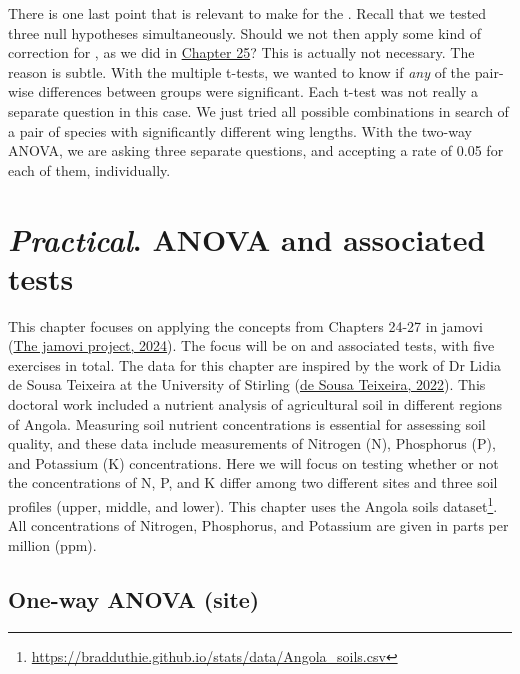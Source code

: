 \documentclass[
  openany]{krantz}
\begin{document}
There is one last point that is relevant to make for the .
Recall that we tested three null hypotheses simultaneously.
Should we not then apply some kind of correction for , as we did in \protect\hyperlink{Chapter_25}{Chapter 25}?
This is actually not necessary.
The reason is subtle.
With the multiple t-tests, we wanted to know if \emph{any} of the pair-wise differences between groups were significant.
Each t-test was not really a separate question in this case.
We just tried all possible combinations in search of a pair of species with significantly different wing lengths.
With the two-way ANOVA, we are asking three separate questions, and accepting a  rate of 0.05 for each of them, individually.

\hypertarget{Chapter_28}{%
\chapter{\texorpdfstring{\emph{Practical}. ANOVA and associated tests}{Practical. ANOVA and associated tests}}\label{Chapter_28}}

This chapter focuses on applying the concepts from Chapters 24-27 in jamovi (\protect\hyperlink{ref-Jamovi2022}{The jamovi project, 2024}).
The focus will be on  and associated tests, with five exercises in total.
The data for this chapter are inspired by the work of Dr Lidia de Sousa Teixeira at the University of Stirling (\protect\hyperlink{ref-Teixeira2022}{de Sousa Teixeira, 2022}).
This doctoral work included a nutrient analysis of agricultural soil in different regions of Angola.
Measuring soil nutrient concentrations is essential for assessing soil quality, and these data include measurements of Nitrogen (N), Phosphorus (P), and Potassium (K) concentrations.
Here we will focus on testing whether or not the concentrations of N, P, and K differ among two different sites and three soil profiles (upper, middle, and lower).
This chapter uses the Angola soils dataset\footnote{\url{https://bradduthie.github.io/stats/data/Angola_soils.csv}}.
All concentrations of Nitrogen, Phosphorus, and Potassium are given in parts per million (ppm).

\hypertarget{one-way-anova-site}{%
\section{One-way ANOVA (site)}\label{one-way-anova-site}}
\end{document}

